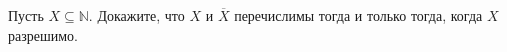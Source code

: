 Пусть $X \subseteq \mathbb{N}$. Докажите, что $X$ и $\overline{X}$ перечислимы тогда и только тогда,
когда $X$ разрешимо.
